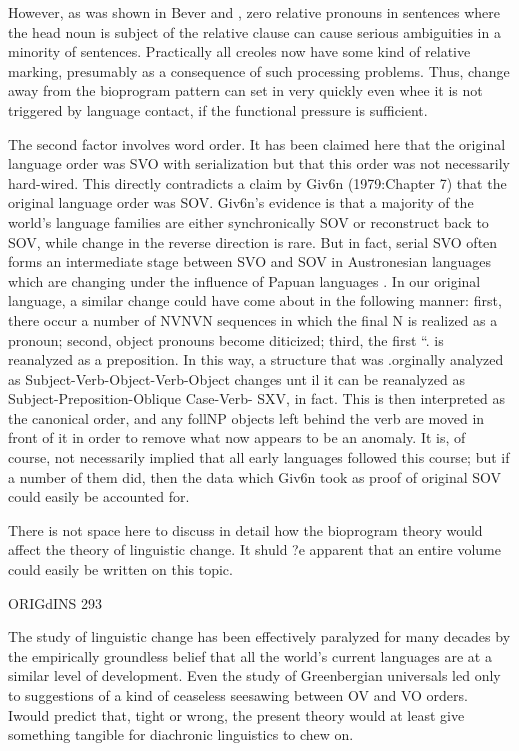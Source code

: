 However, as was shown in Bever and \citet{Langendoen1971}, zero relative pronouns in sentences where the head noun is subject of the relative clause can cause serious ambiguities in a minority of sentences. Practically all creoles now have some kind of relative marking, pre\-sumably as a consequence of such processing problems. Thus, change away from the bioprogram pattern can set in very quickly even whee it is not triggered by language contact, if the functional pressure is sufficient.

The second factor involves word order. It has been claimed here that the original language order was SVO with serialization but that this order was not necessarily hard-wired. This directly contradicts a claim by Giv6n (1979:Chapter 7) that the original language order was SOV. Giv6n's evidence is that a majority of the world's language families are either synchronically SOV or reconstruct back to SOV, while change in the reverse direction is rare. But in fact, serial SVO often forms an intermediate stage between SVO and SOV in Austro\-nesian languages which are changing under the influence of Papuan languages \citep{Bradshaw1979}. In our original language, a similar change could have come about in the following manner: first, there occur a number of NVNVN sequences in which the final N is realized as a pronoun; second, object pronouns become diticized; third, the first ``. is reanalyzed as a preposition. In this way, a structure that was .or\-ginally analyzed as Subject-Verb-Object-Verb-Object changes unt il it can be reanalyzed as Subject-Preposition-Oblique Case-Verb- SXV, in fact. This is then interpreted as the canonical order, and any foll\-NP objects left behind the verb are moved in front of it in order to remove what now appears to be an anomaly. It is, of course, not necessarily implied that all early languages followed this course; but if a number of them did, then the data which Giv6n took as proof of original SOV could easily be accounted for.

There is not space here to discuss in detail how the bioprogram theory would affect the theory of linguistic change. It shuld ?e apparent that an entire volume could easily be written on this topic.


ORIGdINS 293

The study of linguistic change has been effectively paralyzed for many decades by the empirically groundless belief that all the world's current languages are at a similar level of development. Even the study of Greenbergian universals led only to suggestions of a kind of ceaseless seesawing between OV and VO orders. Iwould predict that, tight or wrong, the present theory would at least give something tangible for diachronic linguistics to chew on.

